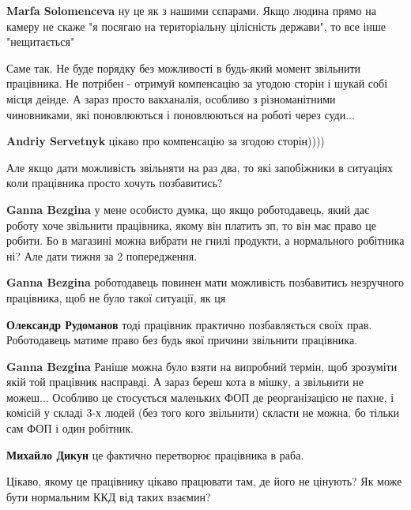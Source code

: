 \begin{itemize}
\begin{itemize}
\textbf{Marfa Solomenceva} ну це як з нашими сєпарами. Якщо людина прямо на камеру не скаже "я посягаю на територіальну цілісність держави", то все інше "нещитається"
\end{itemize} %


Саме так. Не буде порядку без можливості в будь-який момент звільнити
працівника. Не потрібен - отримуй компенсацію за угодою сторін і шукай собі
місця деінде. А зараз просто вакханалія, особливо з різноманітними чиновниками,
які поновлюються і поновлюються на роботі через суди...

\begin{itemize} %
\textbf{Andriy Servetnyk} цікаво про компенсацію за згодою сторін))))
\end{itemize} %

Але якщо дати можливість звільняти на раз два, то які запобіжники в ситуаціях
коли працівника просто хочуть позбавитись?

\begin{itemize} %
\textbf{Ganna Bezgina} у мене особисто думка, що якщо роботодавець, який дає роботу хоче звільнити працівника, якому він платить зп, то він має право це робити.
Бо в магазині можна вибрати не гнилі продукти, а нормального робітника ні? Але дати тижня за 2 попередження.

\textbf{Ganna Bezgina} роботодавець повинен мати можливість позбавитись незручного працівника, щоб не було такої ситуації, як ця

\textbf{Олександр Рудоманов} тоді працівник практично позбавляється своїх прав. Роботодавець матиме право без будь якої причини звільнити працівника.

\textbf{Ganna Bezgina} Раніше можна було взяти на випробний термін, щоб зрозуміти якій той працівник насправді. А зараз береш кота в мішку, а звільнити не можеш... Особливо це стосується маленьких ФОП де реорганізацією не пахне, і комісій у складі 3-х людей (без того кого звільнити) скласти не можна, бо тільки сам ФОП і один робітник.

\textbf{Михайло Дикун} це фактично перетворює працівника в раба.

Цікаво, якому це працівнику цікаво працювати там, де його не цінують? Як може бути нормальним ККД від таких взаємин?


\end{itemize}
\end{itemize}
